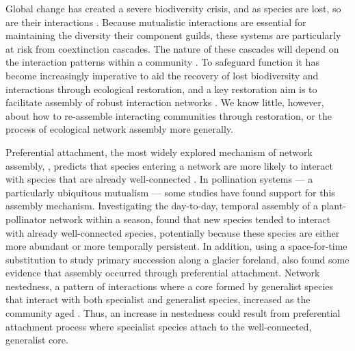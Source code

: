 \documentclass[12pt]{article}
\begin{document}
Global change has created a severe biodiversity crisis, and as species
are lost, so are their interactions \citep{dunn2009sixth,
  barnosky2011has}. Because mutualistic interactions are essential for
maintaining the diversity their component guilds, these systems are
particularly at risk from coextinction cascades. The nature of these
cascades will depend on the interaction patterns within a community
\citep{Memmott2004, Rezende2007, Bascompte2009, Thebault2010}. To
safeguard function it has become increasingly imperative to aid the
recovery of lost biodiversity and interactions through ecological
restoration, and a key restoration aim is to facilitate assembly of
robust interaction networks \citep{menz-2010-4}. We know little,
however, about how to re-assemble interacting communities through
restoration, or the process of ecological network assembly more
generally.

Preferential attachment, the most widely explored mechanism of network
assembly, \citep{barabasi1999emergence}, predicts that species
entering a network are more likely to interact with species that are
already well-connected \citep[''the rich-get-richer''
principle,][]{barabasi1999emergence}. In pollination systems --- a
particularly ubiquitous mutualism \citep{ollerton-2011-321,
  klein-2007-303} --- some studies have found support for this
assembly mechanism. Investigating the day-to-day, temporal assembly of
a plant-pollinator network within a season, \cite{Olesen2008} found
that new species tended to interact with already well-connected
species, potentially because these species are either more abundant or
more temporally persistent. In addition, using a space-for-time
substitution to study primary succession along a glacier foreland,
\cite{albrecht2010plant} also found some evidence that assembly
occurred through preferential attachment. Network nestedness, a
pattern of interactions where a core formed by generalist species that
interact with both specialist and generalist species, increased as the
community aged \citep{albrecht2010plant}. Thus, an increase in
nestedness could result from preferential attachment process where
specialist species attach to the well-connected, generalist
core. %
\end{document}
